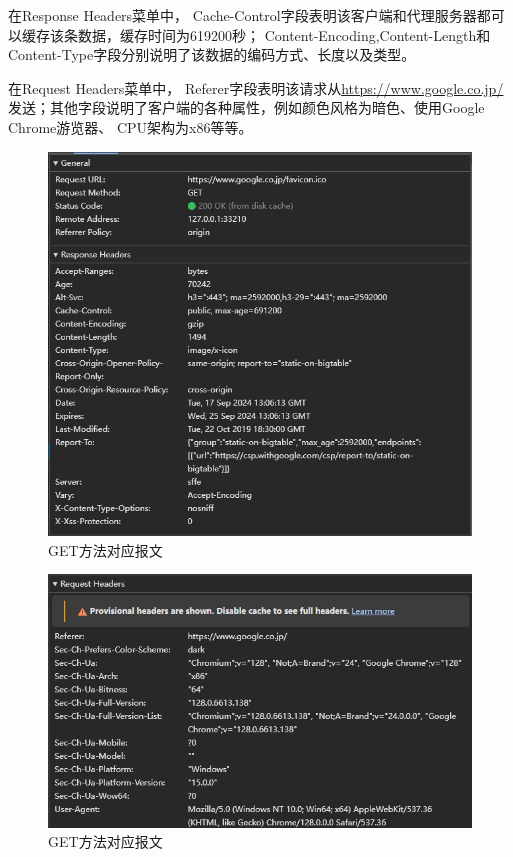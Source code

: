 在Response Headers菜单中，
Cache-Control字段表明该客户端和代理服务器都可以缓存该条数据，缓存时间为619200秒；
Content-Encoding,Content-Length和Content-Type字段分别说明了该数据的编码方式、长度以及类型。

在Request Headers菜单中， 
Referer字段表明该请求从\url{https://www.google.co.jp/}发送；其他字段说明了客户端的各种属性，例如颜色风格为暗色、使用Google Chrome游览器、
CPU架构为x86等等。


\begin{figure}[!htbp]
    \centering
    \includegraphics[width=\textwidth]{figures/GET1.png}
    \caption{GET方法对应报文}\label{GET1}
\end{figure}
\begin{figure}[!htbp]
    \centering
    \includegraphics[width=\textwidth]{figures/GET2.png}
    \caption{GET方法对应报文}\label{GET2}
\end{figure}

